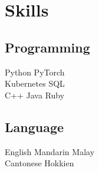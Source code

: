 \documentclass{deedy-resume-openfont}
\begin{document}
\begin{minipage}[t]{0.33\textwidth}



\section{Skills}
\subsection{Programming}
Python \textbullet{} PyTorch \\
Kubernetes \textbullet{} SQL \\

C++ \textbullet{} Java \textbullet{} Ruby \\
\sectionsep

\subsection{Language}
English \textbullet{} Mandarin \textbullet{} Malay \\
Cantonese \textbullet{} Hokkien
\sectionsep

%
%

\end{minipage}
\end{document}
